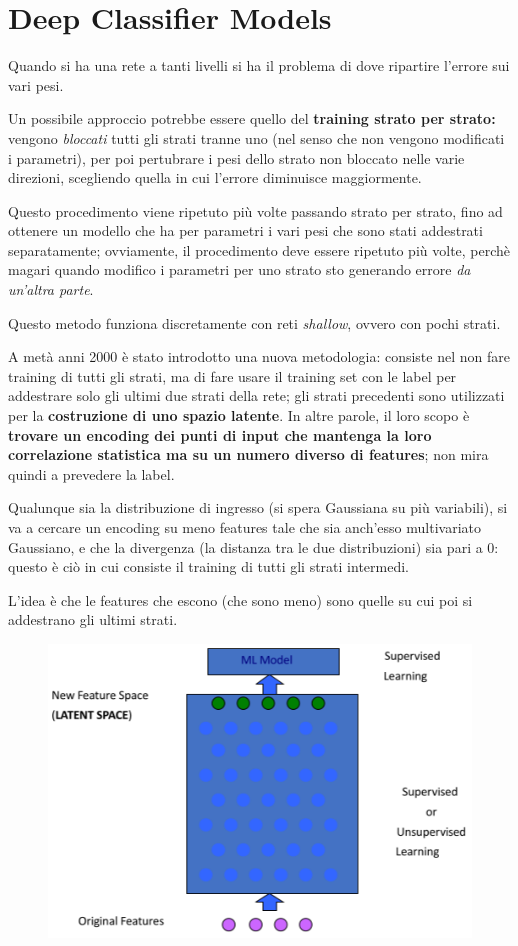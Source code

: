 \documentclass{report}
\begin{document}
\section{Deep Classifier Models}

Quando si ha una rete a tanti livelli si ha il problema di dove ripartire l'errore sui vari pesi.

\noindent Un possibile approccio potrebbe essere quello del \textbf{training strato per strato:} vengono \textit{bloccati} tutti gli strati 
tranne uno (nel senso che non vengono modificati i parametri), per poi pertubrare i pesi dello strato non bloccato nelle varie direzioni, scegliendo 
quella in cui l'errore diminuisce maggiormente. 

\noindent Questo procedimento viene ripetuto più volte passando strato per strato, fino ad ottenere un modello che ha per parametri i vari pesi 
che sono stati addestrati separatamente; ovviamente, il procedimento deve essere ripetuto più volte, perchè magari quando modifico i parametri 
per uno strato sto generando errore \textit{da un'altra parte}.

\noindent Questo metodo funziona discretamente con reti \textit{shallow}, ovvero con pochi strati.

\noindent A metà anni 2000 è stato introdotto una nuova metodologia: consiste nel non fare training di tutti gli strati, ma di 
fare usare il training set con le label per addestrare solo gli ultimi due strati della rete; gli strati precedenti sono utilizzati per 
la \textbf{costruzione di uno spazio latente}. In altre parole, il loro scopo è \textbf{trovare un encoding dei punti di input che mantenga la 
loro correlazione statistica ma su un numero diverso di features}; non mira quindi a prevedere la label.

\noindent Qualunque sia la distribuzione di ingresso (si spera Gaussiana su più variabili), si va a cercare un encoding su meno features tale che 
sia anch'esso multivariato Gaussiano, e che la divergenza (la distanza tra le due distribuzioni) sia pari a 0: questo è ciò in cui consiste il 
training di tutti gli strati intermedi. 

\noindent L'idea è che le features che escono (che sono meno) sono quelle su cui poi si addestrano gli ultimi strati.

\begin{figure}[H]
    \centering
    \includegraphics[width=0.6\linewidth]{images/spazio-latente.png}
\end{figure}
\end{document}
